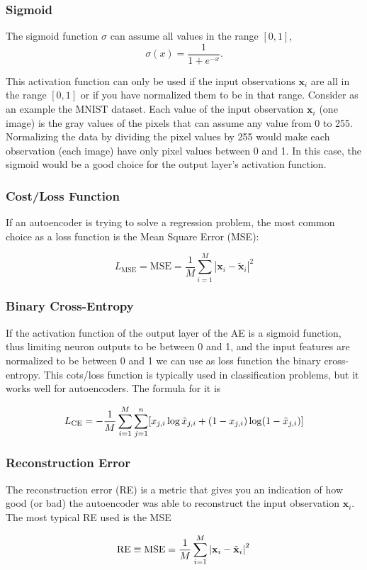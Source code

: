 \documentclass{beamer}
\begin{document}
\begin{frame}
\frametitle{Sigmoid}

The sigmoid function $\sigma$ can assume all values in the range $[0,1]$,
\[
\sigma\left(x\right) =\frac{1}{1+e^{-x}}.
\]

This activation function can only be used if the input observations
$\mathbf{x}_{i}$ are all in the range $[0,1]$  or if you have
normalized them to be in that range. Consider as an example the MNIST
dataset. Each value of the input observation $\mathbf{x}_{i}$ (one
image) is the gray values of the pixels that can assume any value from
0 to 255. Normalizing the data by dividing the pixel values by 255
would make each observation (each image) have only pixel values
between 0 and 1. In this case, the sigmoid would be a good choice for
the output layer's activation function.
\end{frame}

\begin{frame}
\frametitle{Cost/Loss Function}

If an autoencoder is trying to solve a regression problem, the most
common choice as a loss function is the Mean Square Error (MSE):

\[
L_{\textrm{MSE}} = \textrm{MSE} = \frac{1}{M}\sum_{i = 1}^{M}\left\vert\mathbf{x}_{i}-\tilde{\mathbf{x}}_{i}\right\vert^{2}
\]
\end{frame}

\begin{frame}
\frametitle{Binary Cross-Entropy}

If the activation function of the output layer of the AE is a sigmoid
function, thus limiting neuron outputs to be between 0 and 1, and the
input features are normalized to be between 0 and 1 we can use as loss
function the binary cross-entropy. This cots/loss function is
typically used in classification problems, but it works well for
autoencoders. The formula for it is

\[
L_{\textrm{CE}} = -\frac{1}{M}\sum_{i = 1}^{M}\sum_{j = 1}^{n}[x_{j,i} \log\tilde{x}_{j,i}+\left(1-x_{j,i}\right)\log (1-\tilde{x}_{j,i})] \\ 
\]
\end{frame}

\begin{frame}
\frametitle{Reconstruction Error}

The reconstruction error (RE) is a metric that gives you an indication of how good (or bad) the autoencoder was able to reconstruct
the input observation $\mathbf{x}_{i}$. The most typical RE used is the MSE

\[
\textrm{RE}\equiv \textrm{MSE} = \frac{1}{M}\sum_{i = 1}^{M}\left\vert\mathbf{x}_{i}-\tilde{\mathbf{x}}_{i}\right\vert^{2}\\ 
\]
\end{frame}
\end{document}

